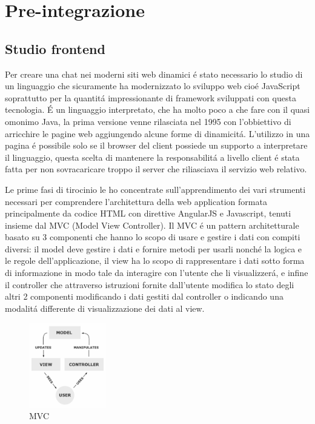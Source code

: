 \chapter{Pre-integrazione}


\section{Studio frontend}
Per creare una chat nei moderni siti web dinamici \'e stato necessario lo studio di un linguaggio che sicuramente ha modernizzato lo sviluppo web cio\'e JavaScript soprattutto per la quantit\'a impressionante di framework sviluppati con questa tecnologia.
\'E un linguaggio interpretato, che ha molto poco a che fare con il quasi omonimo Java, la prima versione venne rilasciata nel 1995 con l'obbiettivo di arricchire le pagine web aggiungendo alcune forme di dinamicit\'a. L'utilizzo in una pagina \'e possibile solo se il browser del client possiede un supporto a interpretare il linguaggio, questa scelta di mantenere la responsabilit\'a a livello client \'e stata fatta per non sovracaricare troppo il server che riliasciava il servizio web relativo.

Le prime fasi di tirocinio le ho concentrate sull'apprendimento dei vari strumenti necessari per comprendere l'architettura della web application formata principalmente da codice HTML con direttive AngularJS e Javascript, tenuti insieme dal MVC (Model View Controller).
Il MVC \'e un pattern architetturale basato su 3 componenti che hanno lo scopo di usare e gestire i dati con compiti diversi: il model deve gestire i dati e fornire metodi per usarli nonch\'e la logica e le regole dell'applicazione, il view ha lo scopo di rappresentare i dati sotto forma di informazione in modo tale da interagire con l'utente che li visualizzer\'a, e infine il controller che attraverso istruzioni fornite dall'utente modifica lo stato degli altri 2 componenti modificando i dati gestiti dal controller o indicando una modalit\'a differente di visualizzazione dei dati al view.
\begin{figure}[H]
 \centering
  \includegraphics[width=0.3\textwidth]{img/MVC-Process.png}
 \caption{MVC}
 \end{figure}
